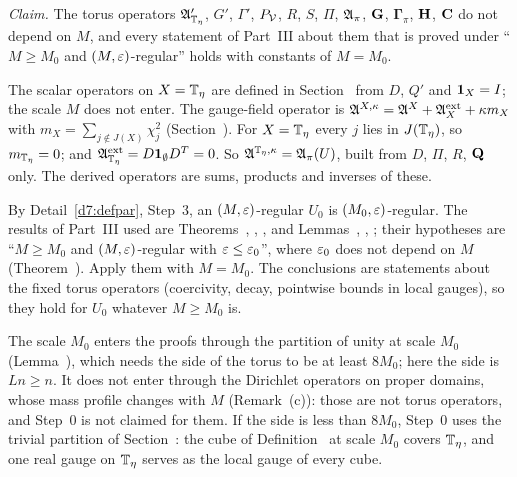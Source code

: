 \begin{detail}\label{d7:step0}
\emph{Claim.} The torus operators $\mathfrak A'_{\mathbb T_\eta}$, $G'$, $\Gamma'$, $P_\mathcal V$, $R$, $S$, $\Pi$, $\mathfrak A_\pi$, $\mathbf G$, $\boldsymbol\Gamma_\pi$, $\mathbf H$, $\mathbf C$ do not depend on $M$, and every statement of Part~III about them that is proved under ``$M\ge M_0$ and $(M,\varepsilon)$-regular'' holds with constants of $M=M_0$.
\begin{step}
The scalar operators on $X=\mathbb T_\eta$ are defined in Section~ from $D$, $Q'$ and $\mathbf 1_X=I$; the scale $M$ does not enter. The gauge-field operator is $\mathfrak A^{X,\kappa}=\mathfrak A^X+\mathfrak A^{\rm ext}_X+\kappa m_X$ with $m_X=\sum_{j\notin J(X)}\chi_j^2$ (Section~). For $X=\mathbb T_\eta$ every $j$ lies in $J(\mathbb T_\eta)$, so $m_{\mathbb T_\eta}=0$; and $\mathfrak A^{\rm ext}_{\mathbb T_\eta}=D\mathbf 1_\emptyset D^T=0$. So $\mathfrak A^{\mathbb T_\eta,\kappa}=\mathfrak A_\pi(U)$, built from $D$, $\Pi$, $R$, $\mathbf Q$ only. The derived operators are sums, products and inverses of these.
\end{step}
\begin{step}
By Detail~\ref{d7:defpar}, Step~3, an $(M,\varepsilon)$-regular $U_0$ is $(M_0,\varepsilon)$-regular. The results of Part~III used are Theorems~, , ,  and Lemmas~, , ; their hypotheses are ``$M\ge M_0$ and $(M,\varepsilon)$-regular with $\varepsilon\le\varepsilon_0$'', where $\varepsilon_0$ does not depend on $M$ (Theorem~). Apply them with $M=M_0$. The conclusions are statements about the fixed torus operators (coercivity, decay, pointwise bounds in local gauges), so they hold for $U_0$ whatever $M\ge M_0$ is.
\end{step}
\begin{step}
The scale $M_0$ enters the proofs through the partition of unity at scale $M_0$ (Lemma~), which needs the side of the torus to be at least $8M_0$; here the side is $Ln\ge n$. It does not enter through the Dirichlet operators on proper domains, whose mass profile changes with $M$ (Remark~(c)): those are not torus operators, and Step~0 is not claimed for them. If the side is less than $8M_0$, Step~0 uses the trivial partition of Section~: the cube of Definition~ at scale $M_0$ covers $\mathbb T_\eta$, and one real gauge on $\mathbb T_\eta$ serves as the local gauge of every cube.
\end{step}
\end{detail}


